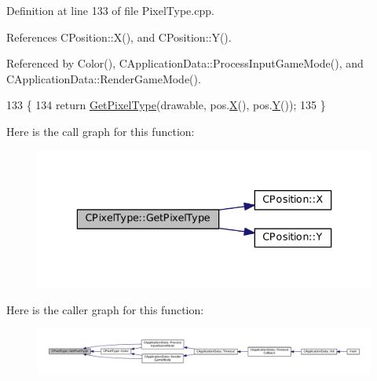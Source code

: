 Definition at line 133 of file Pixel\+Type.\+cpp.



References C\+Position\+::\+X(), and C\+Position\+::\+Y().



Referenced by Color(), C\+Application\+Data\+::\+Process\+Input\+Game\+Mode(), and C\+Application\+Data\+::\+Render\+Game\+Mode().


\begin{DoxyCode}
133                                                                               \{
134     \textcolor{keywordflow}{return} \hyperlink{classCPixelType_af38a22feec4bef33deeb628b0877d464}{GetPixelType}(drawable, pos.\hyperlink{classCPosition_a9a6b94d3b91df1492d166d9964c865fc}{X}(), pos.\hyperlink{classCPosition_a1aa8a30e2f08dda1f797736ba8c13a87}{Y}());
135 \}
\end{DoxyCode}
Here is the call graph for this function\+:\nopagebreak
\begin{figure}[H]
\begin{center}
\leavevmode
\includegraphics[width=336pt]{classCPixelType_af38a22feec4bef33deeb628b0877d464_cgraph}
\end{center}
\end{figure}
Here is the caller graph for this function\+:\nopagebreak
\begin{figure}[H]
\begin{center}
\leavevmode
\includegraphics[width=350pt]{classCPixelType_af38a22feec4bef33deeb628b0877d464_icgraph}
\end{center}
\end{figure}
\hypertarget{classCPixelType_a91ab76ebf6c87934a8738018686746d4}{}\label{classCPixelType_a91ab76ebf6c87934a8738018686746d4} 
